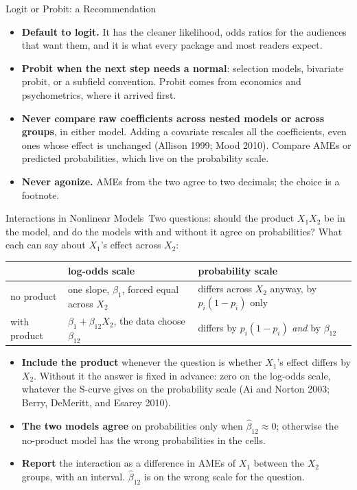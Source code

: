 \documentclass[aspectratio=169,11pt,xcolor=dvipsnames]{beamer}
\newcommand{\srcp}[1]{{\scriptsize\color{gray}(#1)}}
\newcommand{\core}{\,\raisebox{0.6pt}{\textcolor{corestar}{$\bigstar$}}}
\begin{document}
\begin{frame}{Logit or Probit: a Recommendation\core}
\begin{itemize}\itemsep5pt
  \item \textbf{Default to logit.} It has the cleaner likelihood, odds
        ratios for the audiences that want them, and it is what every
        package and most readers expect.
  \item \textbf{Probit when the next step needs a normal}: selection
        models, bivariate probit, or a subfield convention. Probit comes
        from economics and psychometrics, where it arrived first.
  \item \textbf{Never compare raw coefficients across nested models or
        across groups}, in either model. Adding a covariate rescales all
        the coefficients, even ones whose effect is unchanged
        \srcp{Allison 1999; Mood 2010}. Compare AMEs or predicted
        probabilities, which live on the probability scale.
  \item \textbf{Never agonize.} AMEs from the two agree to two decimals;
        the choice is a footnote.
\end{itemize}
\end{frame}

\begin{frame}{Interactions in Nonlinear Models\core}
Two questions: should the product $X_1 X_2$ be in the model, and do the
models with and without it agree on probabilities? What each can say
about $X_1$'s effect across $X_2$:
\begin{center}\footnotesize
\renewcommand{\arraystretch}{1.1}\setlength{\tabcolsep}{5pt}
\begin{tabular}{lll}
\toprule
 & log-odds scale & probability scale \\
\midrule
no product & one slope, $\beta_1$, forced equal across $X_2$ &
  differs across $X_2$ anyway, by $p_i(1-p_i)$ only \\
with product & $\beta_1 + \beta_{12} X_2$, the data choose $\beta_{12}$ &
  differs by $p_i(1-p_i)$ \emph{and} by $\beta_{12}$ \\
\bottomrule
\end{tabular}
\end{center}
\begin{itemize}\itemsep2pt
  \item \textbf{Include the product} whenever the question is whether
        $X_1$'s effect differs by $X_2$. Without it the answer is fixed in
        advance: zero on the log-odds scale, whatever the S-curve gives on
        the probability scale
        \srcp{Ai and Norton 2003; Berry, DeMeritt, and Esarey 2010}.
  \item \textbf{The two models agree} on probabilities only when
        $\hat\beta_{12} \approx 0$; otherwise the no-product model has the
        wrong probabilities in the cells.
  \item \textbf{Report} the interaction as a difference in AMEs of $X_1$
        between the $X_2$ groups, with an interval. $\hat\beta_{12}$ is on
        the wrong scale for the question.
\end{itemize}
\end{frame}
\end{document}
